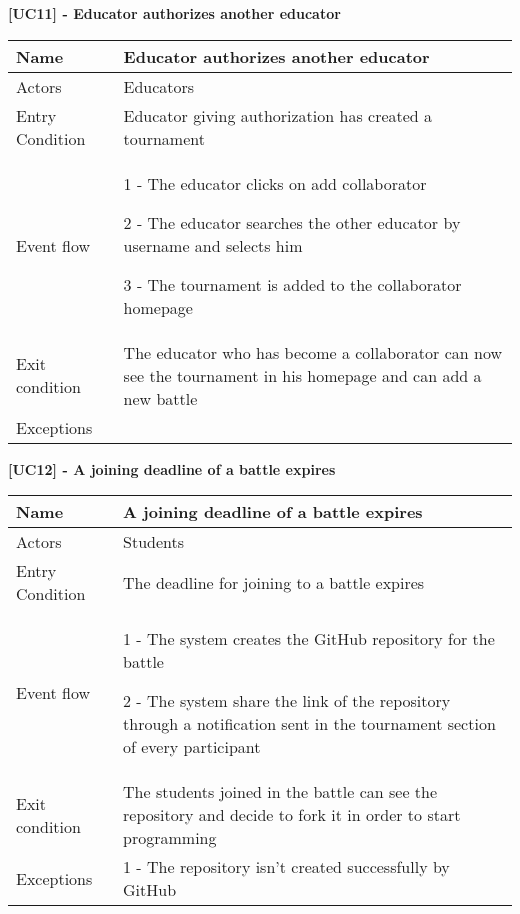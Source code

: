     \begin{table}[h]
    \textbf{[UC11] - Educator authorizes another educator}
    
      \centering
      \begin{tabular}{|p{3cm}|p{14cm}|}
        \hline
         Name & Educator authorizes another educator \\
        \hline
        Actors & Educators \\
        \hline
        Entry Condition & Educator giving authorization has created a tournament \\
        \hline
        Event flow &  1 - The educator clicks on add collaborator
        
        2 - The educator searches the other educator by username and selects him

        3 - The tournament is added to the collaborator homepage
        \\
        \hline
        Exit condition & The educator who has become a collaborator can now see the tournament in his homepage and can add a new battle  \\
        \hline
        Exceptions & 
        \\
        \hline
      \end{tabular}
      
    \end{table}

    \begin{table}[htb]
    \textbf{[UC12] - A joining deadline of a battle expires}
    
      \centering
      \begin{tabular}{|p{3cm}|p{14cm}|}
        \hline
         Name & A joining deadline of a battle expires \\
        \hline
        Actors & Students \\
        \hline
        Entry Condition & The deadline for joining to a battle expires \\
        \hline
        Event flow &  1 - The system creates the GitHub repository for the battle
        
        2 - The system share the link of the repository through a notification sent in the tournament section of every participant
        \\
        \hline
        Exit condition & The students joined in the battle can see the repository and decide to fork it in order to start programming \\
        \hline
        Exceptions & 1 - The repository isn't created successfully by GitHub
        \\
        \hline
      \end{tabular}
      
    \end{table}


